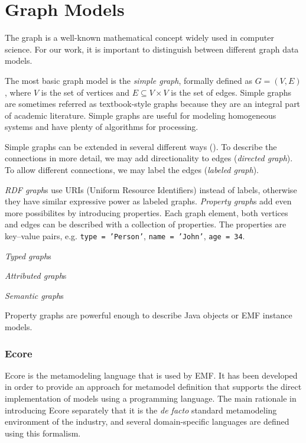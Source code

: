 \section{Graph Models}

The graph is a well-known mathematical concept widely used in computer science. For our work, it is important to distinguish between different graph data models.


The most basic graph model is the \emph{simple graph}, formally defined as $G = (V, E)$, where $V$ is the set of vertices and $E \subseteq V \times V$ is the set of edges. Simple graphs are sometimes referred as textbook-style graphs because they are an integral part of academic literature. Simple graphs are useful for modeling homogeneous systems and have plenty of algorithms for processing.

Simple graphs can be extended in several different ways (). To describe the connections in more detail, we may add directionality to edges (\emph{directed graph}). To allow different connections, we may label the edges (\emph{labeled graph}). 

\emph{RDF graph}s use URIs (Uniform Resource Identifiers) instead of labels, otherwise they have similar expressive power as labeled graphs. \emph{Property graph}s add even more possibilites by introducing properties. Each graph element, both vertices and edges can be described with a collection of properties. The properties are key--value pairs, e.g. \texttt{type = 'Person'}, \texttt{name = 'John'}, \texttt{age = 34}.

\emph{Typed graph}s

\emph{Attributed graph}s

\emph{Semantic graph}s

Property graphs are powerful enough to describe Java objects or EMF instance models. 

\subsubsection{Ecore}
\label{ecore}


Ecore is the metamodeling language that is used by EMF. It has been developed in order to provide an approach
for metamodel definition that supports the direct implementation of models using a programming language. 
The main rationale in introducing Ecore separately that it is the \emph{de facto}
standard metamodeling environment of the industry, and several domain-specific
languages are defined using this formalism.



